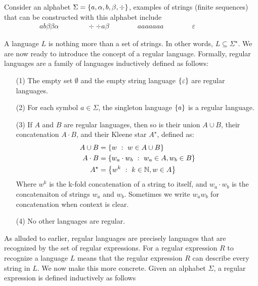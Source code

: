 \begin{example}
  Consider an alphabet \(\Sigma = \left\{a, \alpha, b, \beta, \div\right\}\),
  examples of strings (finite sequences) that can be constructed
  with this alphabet include
  \begin{align*}
    ab\beta\beta\alpha
      \qquad \qquad
    \div\div a \beta
      \qquad \qquad
    a a a a a a a
      \qquad \qquad
    \varepsilon
      \qquad \qquad
  \end{align*}
\end{example}

A language \(L\) is nothing more than a set of strings.
In other words, \(L \subseteq \Sigma^\star\).
We are now ready to introduce the concept of a regular language.
Formally, regular languages are a family of languages inductively
defined as follows:

\begin{enumerate}
  \item[(1)]
    The empty set \(\emptyset\) and the empty string language
    \(\left\{\varepsilon\right\}\) are regular languages.

  \item[(2)]
    For each symbol \(a \in \Sigma\),
    the singleton language \(\left\{a\right\}\) is a regular language.

  \item[(3)]
    If \(A\) and \(B\) are regular languages,
    then so is their union \(A \cup B\),
    their concatenation \(A \cdot B\), and their Kleene star \(A^\star\),
    defined as:
    \begin{align*}
      A \cup B
        &= \left\{w \  : \  w \in A \cup B\right\} \\
      A \cdot B
        &= \left\{w_a \cdot w_b \  : \  w_a \in A, w_b \in B\right\} \\
      A^\star
        &= \left\{w^k \  : \  k \in \mathbb{N}, w \in A\right\}
    \end{align*}
    Where \(w^k\) is the k-fold concatenation of a string to itself,
    and \(w_a \cdot w_b\) is the concatenaiton of strings
    \(w_a\) and \(w_b\).
    Sometimes we write \(w_a w_b\) for concatenation when context is clear.

  \item[(4)]
    No other languages are regular.
\end{enumerate}

As alluded to earlier,
regular languages are precisely languages
that are recognized by the set of regular expressions.
For a regular expression \(R\) to recognize a language \(L\) means that
the regular expression \(R\) can describe every string in \(L\).
We now make this more concrete.
Given an alphabet \(\Sigma\),
a regular expression is defined inductively as follows


